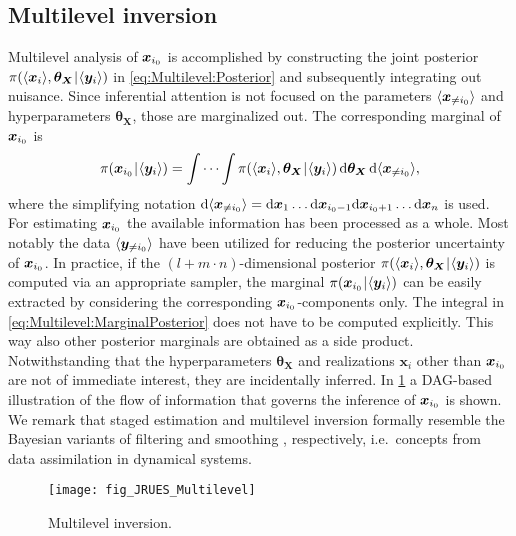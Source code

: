 \subsection{Multilevel inversion} \label{sec:Combination:Multilevel}
Multilevel analysis of \(\bm{x}_{i_0}\) is accomplished by constructing the joint posterior \(\pi(\langle{\bm{x}_i}\rangle,\bm{\theta}_{\bm{X}} {\:\!}|{\:\!} \langle{\bm{y}_i}\rangle)\) in \cref{eq:Multilevel:Posterior} and subsequently integrating out nuisance.
Since inferential attention is not focused on the parameters \(\langle{\bm{x}_{\neq i_0}}\rangle\) and hyperparameters \(\bm{\theta}_{\bm{X}}\), those are marginalized out.
The corresponding marginal of \(\bm{x}_{i_0}\) is
\begin{equation} \label{eq:Multilevel:MarginalPosterior}
  \pi(\bm{x}_{i_0} {\:\!}|{\:\!} \langle{\bm{y}_i}\rangle)
  = \idotsint \pi(\langle{\bm{x}_i}\rangle,\bm{\theta}_{\bm{X}} {\:\!}|{\:\!} \langle{\bm{y}_i}\rangle) \, \mathrm{d}\bm{\theta}_{\bm{X}} \, \mathrm{d} \langle{\bm{x}_{\neq i_0}}\rangle,
\end{equation}
where the simplifying notation \(\mathrm{d}\langle{\bm{x}_{\neq i_0}}\rangle = \mathrm{d}\bm{x}_1 \ldots \mathrm{d}\bm{x}_{i_0-1} \mathrm{d}\bm{x}_{i_0+1} \ldots \mathrm{d}\bm{x}_n\) is used.
For estimating \(\bm{x}_{i_0}\) the available information has been processed as a whole.
Most notably the data \(\langle{\bm{y}_{\neq i_0}}\rangle\) have been utilized for reducing the posterior uncertainty of \(\bm{x}_{i_0}\).
In practice, if the \((l + m \cdot n)\)-dimensional posterior \(\pi(\langle{\bm{x}_i}\rangle,\bm{\theta}_{\bm{X}} {\:\!}|{\:\!} \langle{\bm{y}_i}\rangle)\) is computed via an appropriate sampler,
the marginal \(\pi(\bm{x}_{i_0} {\:\!}|{\:\!} \langle{\bm{y}_i}\rangle)\) can be easily extracted by considering the corresponding \(\bm{x}_{i_0}\)-components only.
The integral in \cref{eq:Multilevel:MarginalPosterior} does not have to be computed explicitly.
This way also other posterior marginals are obtained as a side product.
Notwithstanding that the hyperparameters \(\bm{\theta}_{\bm{X}}\) and realizations \(\bm{x}_i\) other than \(\bm{x}_{i_0}\) are not of immediate interest, they are incidentally inferred.
In \cref{fig:MultilevelInversion} a DAG-based illustration of the flow of information that governs the inference of \(\bm{x}_{i_0}\) is shown.
We remark that staged estimation and multilevel inversion formally resemble the Bayesian variants of filtering and smoothing \cite{Bayesian:Sarkka2013}, respectively, i.e.\ concepts from data assimilation in dynamical systems.
\begin{figure}[ht]
  \centering
  \texttt{[image: fig\_JRUES\_Multilevel]}
  \caption[Multilevel inversion]{Multilevel inversion.}
  \label{fig:MultilevelInversion}
\end{figure}